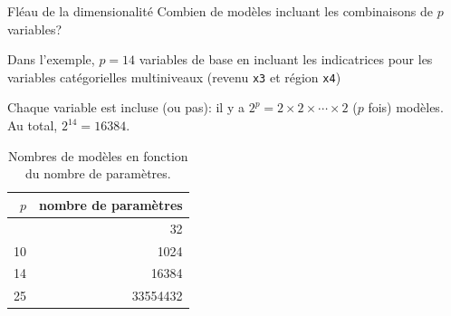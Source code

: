 \documentclass[
  ignorenonframetext,
]{beamer}
\begin{document}
\begin{frame}[fragile]{Fléau de la dimensionalité}
\label{fluxe9au-de-la-dimensionalituxe9}
Combien de modèles incluant les combinaisons de \(p\) variables?

Dans l'exemple, \(p=14\) variables de base en incluant les indicatrices
pour les variables catégorielles multiniveaux (revenu \texttt{x3} et
région \texttt{x4})

Chaque variable est incluse (ou pas): il y a
\(2^p=2\times 2 \times \cdots \times 2\) (\(p\) fois) modèles. Au total,
\(2^{14} = 16384.\)

\begin{longtable}[]{@{}rr@{}}

\caption{\label{tbl-02-table3}Nombres de modèles en fonction du nombre
de paramètres.}

\tabularnewline

\toprule\noalign{}
\(p\) & nombre de paramètres \\
\midrule\noalign{}
\endhead
\bottomrule\noalign{}
\endlastfoot
5 & 32 \\
10 & 1024 \\
14 & 16384 \\
25 & 33554432 \\

\end{longtable}
\end{frame}
\end{document}
